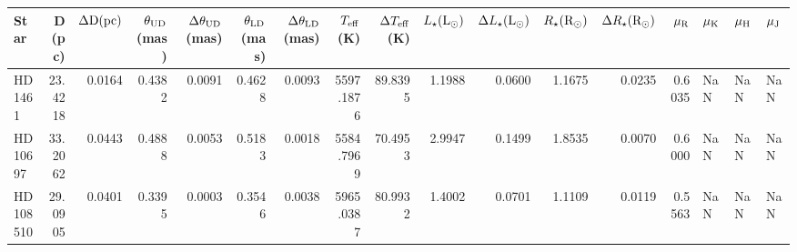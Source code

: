 \begin{tabular}{lrrrrrrrrrrrrrlll}
\toprule
Star & D (pc) & $\Delta \rm D (pc)$ & $\theta_{\rm UD}$ (mas) & $\Delta\theta_{\rm UD}$ (mas) & $\theta_{\rm LD}$ (mas) & $\Delta\theta_{\rm LD}$ (mas) & $T_{\rm eff}$ (K) & $\Delta T_{\rm eff}$ (K) & $L_{\star} (\rm L_{\odot})$ & $\Delta L_{\star} (\rm L_{\odot})$ & $R_{\star} (\rm R_{\odot})$ & $\Delta R_{\star} (\rm R_{\odot})$ & $\mu_{\rm R}$ & $\mu_{\rm K}$ & $\mu_{\rm H}$ & $\mu_{\rm J}$ \\
\midrule
HD 1461 & 23.4218 & 0.0164 & 0.4382 & 0.0091 & 0.4628 & 0.0093 & 5597.1876 & 89.8395 & 1.1988 & 0.0600 & 1.1675 & 0.0235 & 0.6035 & NaN & NaN & NaN \\
HD 10697 & 33.2062 & 0.0443 & 0.4888 & 0.0053 & 0.5183 & 0.0018 & 5584.7969 & 70.4953 & 2.9947 & 0.1499 & 1.8535 & 0.0070 & 0.6000 & NaN & NaN & NaN \\
HD 108510 & 29.0905 & 0.0401 & 0.3395 & 0.0003 & 0.3546 & 0.0038 & 5965.0387 & 80.9932 & 1.4002 & 0.0701 & 1.1109 & 0.0119 & 0.5563 & NaN & NaN & NaN \\
\bottomrule
\end{tabular}
